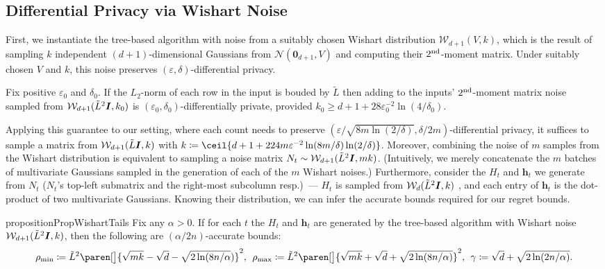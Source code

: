 \documentclass{article}
\renewcommand{\vec}[1]{\bm{#1}}
\newcommand{\defeq}{\coloneq}
\DeclarePairedDelimiter{\paren}()
\DeclarePairedDelimiter{\ceil}\lceil\rceil
\newcommand{\Wishart}{\mathcal{W}}
\newcommand{\Normal}{\mathcal{N}}
\newcommand{\Eye}[1][]{\bm{I}\notblank{#1}{_{{#1}\times{#1}}}{}}
\begin{document}
\subsection{Differential Privacy via Wishart Noise}
\label{sec:dp-wishart}

First, we instantiate the tree-based algorithm with noise from a
suitably chosen Wishart distribution $\Wishart_{d+1}(V, k)$, which is the
result of sampling $k$ independent $(d+1)$-dimensional Gaussians from
$\Normal(\vec 0_{d+1}, V)$ and computing their $2^{\rm nd}$-moment
matrix. Under suitably chosen $V$ and $k$, this noise preserves
$(\varepsilon,\delta)$-differential privacy.

\begin{theorem}%
  \label{thm:wishart-cont-dp}
  Fix positive $\varepsilon_0$ and $\delta_0$. If the $L_2$-norm of each
  row in the input is bouded by $\tilde L$ then adding to the inputs'
  $2^{\rm nd}$-moment matrix noise sampled from $\Wishart_{d+1}(\tilde
  L^2 \Eye, k_0)$ is $(\varepsilon_0,\delta_0)$-differentially private,
  provided $k_0\geq d+1 + 28\varepsilon_0^{-2}\ln(4/\delta_0)$.
\end{theorem}
Applying this guarantee to our setting, where each count needs to
preserve
$(\varepsilon/\sqrt{8m\ln(2/\delta)}, \delta/2m)$-differential
privacy, it suffices to sample a matrix from
$\Wishart_{d+1}(\tilde{L} \Eye, k)$ with
$k \defeq \ceil{d+1 + 224
  m\varepsilon^{-2}\ln(8m/\delta)\ln(2/\delta)}$. Moreover, combining
the noise of $m$ samples from the Wishart distribution is equivalent
to sampling a noise matrix
$N_t\sim \Wishart_{d+1}(\tilde L^2\Eye, mk)$. (Intuitively, we merely
concatenate the $m$ batches of multivariate Gaussians sampled in the
generation of each of the $m$ Wishart noises.) Furthermore, consider
the $H_t$ and $\vec h_t$ we generate from $N_t$ ($N_t$'s top-left
submatrix and the right-most subcolumn resp.)~--- $H_t$ is sampled
from $\Wishart_d(\tilde L^2\Eye,k)$ , and each entry of $\vec h_t$ is
the dot-product of two multivariate Gaussians. Knowing their
distribution, we can infer the accurate bounds required for our regret
bounds.
\begin{restatable}{proposition}{PropWishartTails}
\label{pro:accurate_bounds_for_Wishart}
Fix any $\alpha>0$. If for each $t$ the $H_t$ and $\vec h_t$ are
generated by the tree-based algorithm with Wishart noise
$\Wishart_{d+1}(\tilde L^2 \Eye, k)$, then the following
are $(\alpha/2n)$-accurate bounds:
{\small\begin{align*}
    \rho_{\min} \defeq \tilde L^2 \paren[\big]{\sqrt{mk}
                 - \sqrt{d} - \sqrt{2\ln(8n/\alpha})}^2,\;\,
    \rho_{\max} \defeq \tilde L^2 \paren[\big]{\sqrt{mk}
                 + \sqrt{d} + \sqrt{2\ln(8n/\alpha)}}^2,\;\,
    \gamma \defeq \sqrt{d} + \sqrt{2\ln(2n/\alpha)}.
 \end{align*}}
\end{restatable}
\end{document}
